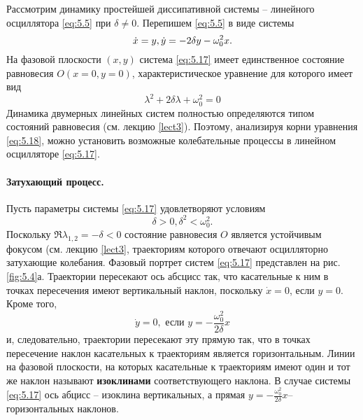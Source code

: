 Рассмотрим динамику простейшей диссипативной системы -- линейного осциллятора \eqref{eq:5.5} при $\delta \neq 0$. Перепишем \eqref{eq:5.5} в виде системы
\begin{equation}
        \label{eq:5.17}
        \dot x = y, \\
        \dot y = -2 \delta y - \omega_0^2 x.
\end{equation}
На фазовой плоскости $(x,y)$ система \eqref{eq:5.17} имеет единственное состояние равновесия $O(x=0,y=0)$, характеристическое уравнение для которого имеет вид
\begin{equation}
        \label{eq:5.18}
        \lambda^2 + 2 \delta \lambda + \omega_0^2 = 0 
\end{equation}
Динамика двумерных линейных систем полностью определяются типом состояний равновесия (см. лекцию 
\ref{lect3}). Поэтому, анализируя корни уравнения \eqref{eq:5.18}, можно установить возможные колебательные процессы в линейном осцилляторе \eqref{eq:5.17}.

\paragraph{Затухающий процесс.}%
\label{par:zatukhaiushchii_protsess_}

Пусть параметры системы \eqref{eq:5.17} удовлетворяют условиям
\begin{equation}
        \label{eq:5.19}
        \delta > 0, \delta^2 < \omega_0^2.
\end{equation}
Поскольку $\Re \lambda_{1,2} = - \delta < 0 $ состояние равновесия $O$ является устойчивым фокусом
(см. лекцию \ref{lect3}, траекториям которого отвечают осцилляторно затухающие колебания. Фазовый портрет систем \eqref{eq:5.17} представлен на рис.\ref{fig:5.4}а. Траектории пересекают ось абсцисс так, что касательные к ним в точках пересечения имеют вертикальный наклон, поскольку $\dot x =0$, если $y=0$. Кроме того,
\begin{equation}
        \label{eq:}
        \dot y =0, \text{ если } y= - \frac{\omega_0^2}{2\delta}x
\end{equation}
и, следовательно, траектории пересекают эту прямую так, что в точках пересечение наклон касательных к траекториям является горизонтальным. Линии на фазовой плоскости, на которых касательные к траекториям имеют один и тот же наклон называют
\textbf{изоклинами}
соответствующего наклона. В случае системы \eqref{eq:5.17} ось абцисс -- изоклина вертикальных, а прямая $y = - \frac{\omega_0^2}{2\delta}x$-- горизонтальных наклонов.

